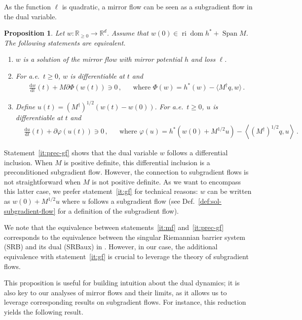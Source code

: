 \documentclass[11pt,english,reqno]{article}
\DeclareMathOperator{\Span}{Span}
\DeclareMathOperator{\dom}{dom}
\DeclareMathOperator{\ri}{ri}
\newcommand{\diff}{\mathrm{d}}
\newcommand{\R}{\mathbb{R}}
\renewcommand{\geq}{\geqslant}
\theoremstyle{plain}
\newtheorem{proposition}{Proposition}[section]
\theoremstyle{definition}
\theoremstyle{remark}
\numberwithin{equation}{section}
\begin{document}
As the function $\ell$ is quadratic, a mirror flow can be seen as a subgradient flow in the dual variable. 

\begin{proposition}
	\label{prop:equivalences-mf-gf}
	Let $w: \R_{\geq 0} \to \R^d$. Assume that $w(0) \in \ri \dom h^* + \Span M$. The following statements are equivalent.
	\begin{enumerate}[label=(\alph*)]
		\item\label{it:mf} $w$ is a solution of the mirror flow with mirror potential $h$ and loss $\ell$.
		\item\label{it:prec-gf} For a.e.~$t \geq 0$, $w$ is differentiable at $t$ and
		\begin{align*}
			&\frac{\diff w}{\diff t}(t) + M\partial \Phi(w(t)) \ni 0 \, , &&\text{where } \Phi(w) = h^*(w) - \langle M^\dagger q , w \rangle \, .
		\end{align*}
		\item\label{it:gf} Define $u(t) = (M^\dagger)^{1/2} (w(t) - w(0))$. For a.e.~$t \geq 0$, $u$ is differentiable at $t$ and
		\begin{align*}
			&\frac{\diff u}{\diff t}(t) + \partial \varphi(u(t)) \ni 0 \, , &&\text{where } \varphi(u ) = h^*\left(w(0)+M^{1/2}u\right) - \left\langle (M^\dagger)^{1/2} q , u \right\rangle \, .
		\end{align*}
	\end{enumerate}
\end{proposition}

Statement~\ref{it:prec-gf} shows that the dual variable $w$ follows a differential inclusion. When $M$ is positive definite, this differential inclusion is a preconditioned subgradient flow. However, the connection to subgradient flows is not straightforward when $M$ is not positive definite. As we want to encompass this latter case, we prefer statement~\ref{it:gf} for technical reasons: $w$ can be written as $w(0) + M^{1/2} u$ where $u$ follows a subgradient flow (see Def.~\ref{def:sol-subgradient-flow} for a definition of the subgradient flow).

We note that the equivalence between statements~\ref{it:mf} and~\ref{it:prec-gf} corresponds to the equivalence between the singular Riemannian barrier system (SRB) and its dual (SRBaux) in \cite{attouch2004singular}. However, in our case, the additional equivalence with statement~\ref{it:gf} is crucial to leverage the theory of subgradient flows.

This proposition is useful for building intuition about the dual dynamics; it is also key to our analyses of mirror flows and their limits, as it allows us to leverage corresponding results on subgradient flows. For instance, this reduction yields the following result.
\end{document}
